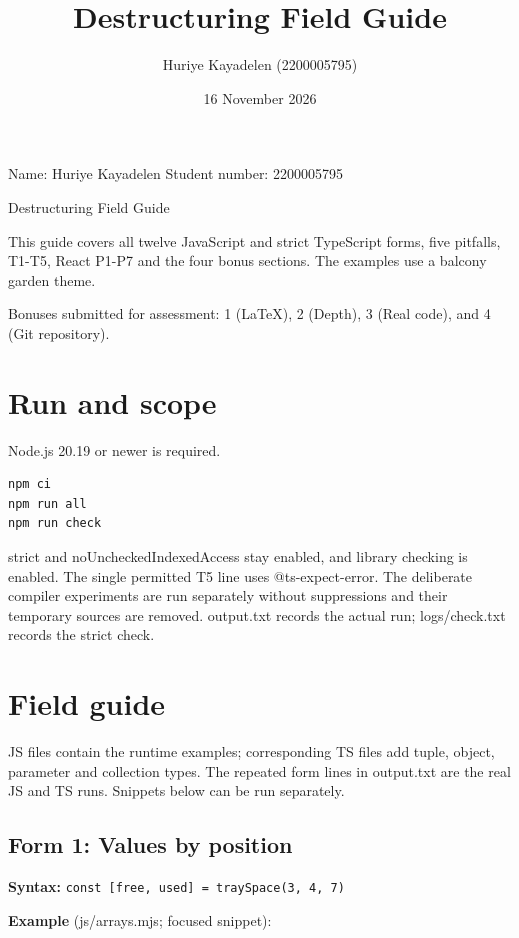 \documentclass[
  10pt,
  a4paper,
]{article}
\title{Destructuring Field Guide}
\author{Huriye Kayadelen (2200005795)}
\date{16 November 2026}
\begin{document}
\maketitle

{
\setcounter{tocdepth}{3}
\tableofcontents
}
Name: Huriye Kayadelen Student number: 2200005795

Destructuring Field Guide

This guide covers all twelve JavaScript and strict TypeScript forms,
five pitfalls, T1-T5, React P1-P7 and the four bonus sections. The
examples use a balcony garden theme.

Bonuses submitted for assessment: 1 (LaTeX), 2 (Depth), 3 (Real code),
and 4 (Git repository).

\section{Run and scope}\label{run-and-scope}

Node.js 20.19 or newer is required.

\begin{lstlisting}[language=sh]
npm ci
npm run all
npm run check
\end{lstlisting}

strict and noUncheckedIndexedAccess stay enabled, and library checking
is enabled. The single permitted T5 line uses @ts-expect-error. The
deliberate compiler experiments are run separately without suppressions
and their temporary sources are removed. output.txt records the actual
run; logs/check.txt records the strict check.

\section{Field guide}\label{field-guide}

JS files contain the runtime examples; corresponding TS files add tuple,
object, parameter and collection types. The repeated form lines in
output.txt are the real JS and TS runs. Snippets below can be run
separately.

\subsection{Form 1: Values by position}\label{form-1-values-by-position}

\textbf{Syntax:}
\texttt{const [free,\allowbreak{} used] =\allowbreak{} traySpace(3,\allowbreak{} 4,\allowbreak{} 7)}

\textbf{Example} (js/arrays.mjs; focused snippet):
\end{document}
